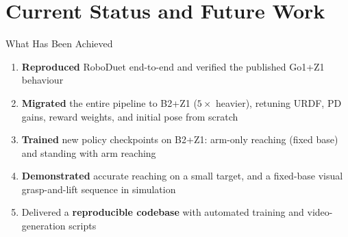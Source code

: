 \documentclass[10pt,aspectratio=169]{beamer}
\begin{document}
\section{Current Status and Future Work}

\begin{frame}{What Has Been Achieved}
  \begin{enumerate}
    \setlength{\itemsep}{7pt}
    \item \textbf{Reproduced} RoboDuet end-to-end and verified the published
          Go1+Z1 behaviour

    \item \textbf{Migrated} the entire pipeline to B2+Z1
          ($5\times$ heavier), retuning URDF, PD gains, reward weights,
          and initial pose from scratch

    \item \textbf{Trained} new policy checkpoints on B2+Z1:
          arm-only reaching (fixed base) and standing with arm reaching

    \item \textbf{Demonstrated} accurate reaching on a small target,
          and a fixed-base visual grasp-and-lift sequence in simulation

    \item Delivered a \textbf{reproducible codebase}
          with automated training and video-generation scripts
  \end{enumerate}
\end{frame}
\end{document}
